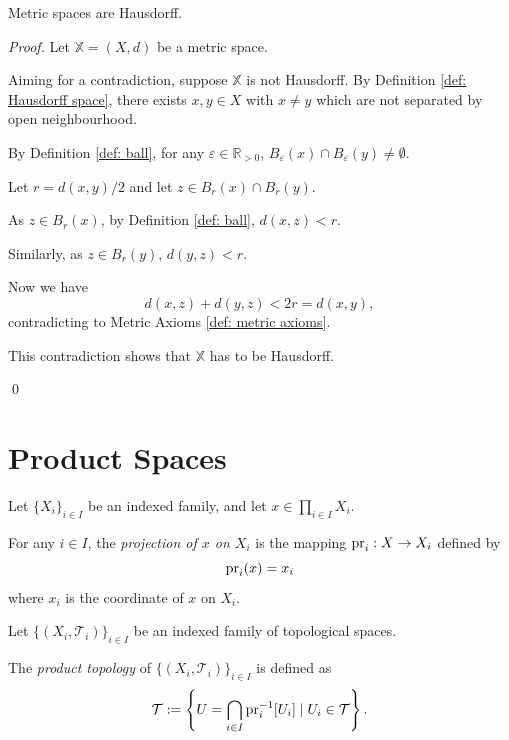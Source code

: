 \begin{proposition}
	Metric spaces are Hausdorff.
	
	\begin{proof}
		Let $\mathbb X = (X, d)$ be a metric space.
		
		Aiming for a contradiction, suppose $\mathbb X$ is not Hausdorff. By Definition \ref{def: Hausdorff space}, there exists $x,y \in X$ with $x \ne y$ which are not separated by open neighbourhood.
		
		By Definition \ref{def: ball}, for any $\varepsilon \in \mathbb R_{> 0}$, $B_\varepsilon(x) \cap B_\varepsilon(y) \ne \emptyset$.
		
		Let $r = d(x,y) / 2$ and let $z \in B_r(x) \cap B_r(y)$.
		
		As $z \in B_r(x)$, by Definition \ref{def: ball}, $d(x,z) < r$.
		
		Similarly, as $z \in B_r(y)$, $d(y,z) < r$.
		
		Now we have
		$$
		d(x,z) + d(y,z) < 2r = d(x,y),
		$$
		contradicting to Metric Axioms \ref{def: metric axioms}.
		
		This contradiction shows that $\mathbb X$ has to be Hausdorff.
		
		\qed
	\end{proof}
\end{proposition}


\section{Product Spaces}


\begin{definition}
	\label{def: projection}
	Let $\{X_i\}_{i \in I}$ be an indexed family, and let $\displaystyle x \in \prod_{i \in I}X_i$.
	
	For any $i \in I$, the \textit{projection of $x$ on $X_i$} is the mapping $\mathrm{pr}_i: X \to X_i$ defined by
	$$
	\mathrm{pr}_i(x) = x_i
	$$
	where $x_i$ is the coordinate of $x$ on $X_i$.
\end{definition}


\begin{definition}
	\label{def: product space}
	Let $\{(X_i, \mathcal T_i)\}_{i \in I}$ be an indexed family of topological spaces.
	
	The \textit{product topology} of $\{(X_i, \mathcal T_i)\}_{i \in I}$ is defined as
	$$
	\mathcal T := \left\{ U = \bigcap_{i \in I} \mathrm{pr}_i^{-1}[U_i] \;|\; U_i \in \mathcal T \right\}.
	$$
\end{definition}
























\begin{appendices}
		
\end{appendices}
